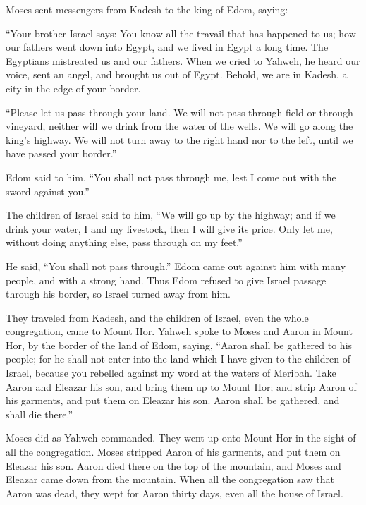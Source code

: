  Moses sent messengers from Kadesh to the king of Edom,
saying:

``Your brother Israel says: You know all the travail that has happened
to us;  how our fathers went down into Egypt, and we
lived in Egypt a long time. The Egyptians mistreated us and our fathers.
 When we cried to Yahweh, he heard our voice, sent an
angel, and brought us out of Egypt. Behold, we are in Kadesh, a city in
the edge of your border.

 ``Please let us pass through your land. We will not pass
through field or through vineyard, neither will we drink from the water
of the wells. We will go along the king's highway. We will not turn away
to the right hand nor to the left, until we have passed your border.''

 Edom said to him, ``You shall not pass through me, lest
I come out with the sword against you.''

 The children of Israel said to him, ``We will go up by
the highway; and if we drink your water, I and my livestock, then I will
give its price. Only let me, without doing anything else, pass through
on my feet.''

 He said, ``You shall not pass through.'' Edom came out
against him with many people, and with a strong hand. 
Thus Edom refused to give Israel passage through his border, so Israel
turned away from him.

 They traveled from Kadesh, and the children of Israel,
even the whole congregation, came to Mount Hor.  Yahweh
spoke to Moses and Aaron in Mount Hor, by the border of the land of
Edom, saying,  ``Aaron shall be gathered to his people;
for he shall not enter into the land which I have given to the children
of Israel, because you rebelled against my word at the waters of
Meribah.  Take Aaron and Eleazar his son, and bring them
up to Mount Hor;  and strip Aaron of his garments, and
put them on Eleazar his son. Aaron shall be gathered, and shall die
there.''

 Moses did as Yahweh commanded. They went up onto Mount
Hor in the sight of all the congregation.  Moses stripped
Aaron of his garments, and put them on Eleazar his son. Aaron died there
on the top of the mountain, and Moses and Eleazar came down from the
mountain.  When all the congregation saw that Aaron was
dead, they wept for Aaron thirty days, even all the house of Israel.

